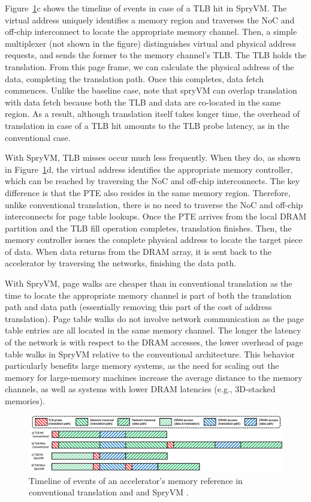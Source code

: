 Figure~\ref{fig:timeline}c shows the timeline of events
in case of a TLB hit in SpryVM. The virtual address uniquely identifies a
memory region and traverses the NoC and off-chip interconnect to
locate the appropriate memory channel. Then, a simple multiplexer (not
shown in the figure) distinguishes virtual and physical address
requests, and sends the former to the memory channel's TLB. The TLB
holds the translation. From this page frame, we can calculate the
physical address of the data, completing the translation path. Once
this completes, data fetch commences. Unlike the baseline case, note
that spryVM can overlap translation with data fetch because
both the TLB and data are co-located in the same region. As a result, although 
translation itself takes longer time, the overhead of translation in case of a TLB hit 
amounts to the TLB probe latency, as in the conventional case.

With SpryVM, TLB misses occur much less frequently. When they do, as
shown in Figure~\ref{fig:timeline}d, the virtual address
identifies the appropriate memory controller, which can be reached by
traversing the NoC and off-chip interconnects. The key difference is that
the PTE also resides in the same memory region. Therefore, unlike conventional translation, there is no need
to traverse the NoC and off-chip interconnects for page table
lookups. Once the PTE arrives from the local DRAM partition and the
TLB fill operation completes, translation finishes. Then, the memory
controller issues the complete physical address to locate the target
piece of data. When data returns from the DRAM array, it is sent back
to the accelerator by traversing the networks, finishing the data
path.

With SpryVM, page walks are cheaper than in conventional translation
as the time to locate the appropriate memory channel is part of both
the translation path and data path (essentially removing this part of
the cost of address translation). Page table walks do not involve
network communication as the page table entries are all located in the
same memory channel. The longer the latency of the network is with
respect to the DRAM accesses, the lower overhead of page table walks
in SpryVM relative to the conventional architecture. This behavior particularly 
benefits large memory systems, as the need
for scaling out the memory for large-memory machines increase the
average distance to the memory channels, as well as systems with lower DRAM
latencies (e.g., 3D-stacked memories).


\begin{figure}
	\includegraphics[width=\textwidth]{figures/Fig345.png}
	\caption{Timeline of events of an accelerator's memory reference in conventional translation and and SpryVM .}
	\label{fig:timeline}
\end{figure}


